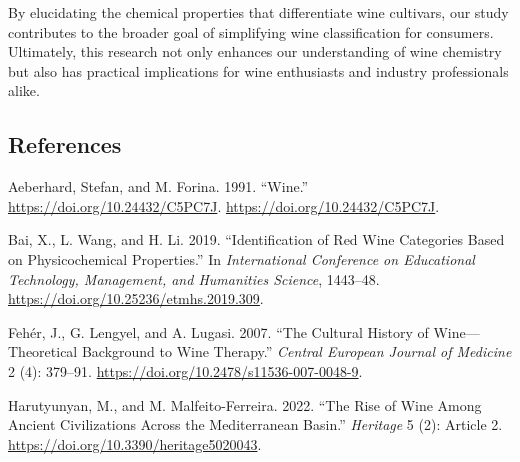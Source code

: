 \documentclass[
  letterpaper,
  DIV=11,
  numbers=noendperiod]{scrartcl}
\newlength{\cslhangindent}
\newenvironment{CSLReferences}[2] %
 {\begin{list}{}{%
  \setlength{\itemindent}{0pt}
  \setlength{\leftmargin}{0pt}
  \setlength{\parsep}{0pt}
  \ifodd #1
   \setlength{\leftmargin}{\cslhangindent}
   \setlength{\itemindent}{-1\cslhangindent}
  \fi
  \setlength{\itemsep}{#2\baselineskip}}}
 {\end{list}}
\begin{document}
By elucidating the chemical properties that differentiate wine
cultivars, our study contributes to the broader goal of simplifying wine
classification for consumers. Ultimately, this research not only
enhances our understanding of wine chemistry but also has practical
implications for wine enthusiasts and industry professionals alike.

\subsection*{References}\label{references}

\label{refs}
\begin{CSLReferences}{1}{0}
Aeberhard, Stefan, and M. Forina. 1991. {``Wine.''}
\url{https://doi.org/10.24432/C5PC7J}.
\url{https://doi.org/10.24432/C5PC7J}.

Bai, X., L. Wang, and H. Li. 2019. {``Identification of Red Wine
Categories Based on Physicochemical Properties.''} In
\emph{International Conference on Educational Technology, Management,
and Humanities Science}, 1443--48.
\url{https://doi.org/10.25236/etmhs.2019.309}.

Fehér, J., G. Lengyel, and A. Lugasi. 2007. {``The Cultural History of
Wine---Theoretical Background to Wine Therapy.''} \emph{Central European
Journal of Medicine} 2 (4): 379--91.
\url{https://doi.org/10.2478/s11536-007-0048-9}.

Harutyunyan, M., and M. Malfeito-Ferreira. 2022. {``The Rise of Wine
Among Ancient Civilizations Across the Mediterranean Basin.''}
\emph{Heritage} 5 (2): Article 2.
\url{https://doi.org/10.3390/heritage5020043}.

\end{CSLReferences}
\end{document}
